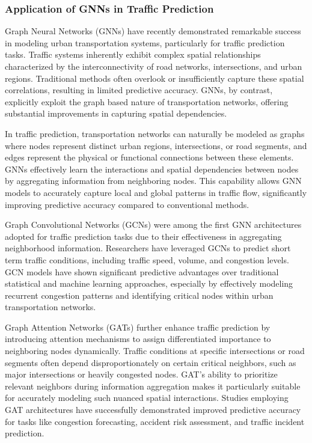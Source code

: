 \documentclass{article}
\begin{document}
\subsubsection{Application of GNNs in Traffic Prediction}

Graph Neural Networks (GNNs) have recently demonstrated remarkable success in modeling urban transportation systems, particularly for traffic prediction tasks. Traffic systems inherently exhibit complex spatial relationships characterized by the interconnectivity of road networks, intersections, and urban regions. Traditional methods often overlook or insufficiently capture these spatial correlations, resulting in limited predictive accuracy. GNNs, by contrast, explicitly exploit the graph based nature of transportation networks, offering substantial improvements in capturing spatial dependencies.

In traffic prediction, transportation networks can naturally be modeled as graphs where nodes represent distinct urban regions, intersections, or road segments, and edges represent the physical or functional connections between these elements. GNNs effectively learn the interactions and spatial dependencies between nodes by aggregating information from neighboring nodes. This capability allows GNN models to accurately capture local and global patterns in traffic flow, significantly improving predictive accuracy compared to conventional methods.

Graph Convolutional Networks (GCNs) were among the first GNN architectures adopted for traffic prediction tasks due to their effectiveness in aggregating neighborhood information. Researchers have leveraged GCNs to predict short term traffic conditions, including traffic speed, volume, and congestion levels. GCN models have shown significant predictive advantages over traditional statistical and machine learning approaches, especially by effectively modeling recurrent congestion patterns and identifying critical nodes within urban transportation networks.

Graph Attention Networks (GATs) further enhance traffic prediction by introducing attention mechanisms to assign differentiated importance to neighboring nodes dynamically. Traffic conditions at specific intersections or road segments often depend disproportionately on certain critical neighbors, such as major intersections or heavily congested nodes. GAT’s ability to prioritize relevant neighbors during information aggregation makes it particularly suitable for accurately modeling such nuanced spatial interactions. Studies employing GAT architectures have successfully demonstrated improved predictive accuracy for tasks like congestion forecasting, accident risk assessment, and traffic incident prediction.
\end{document}
